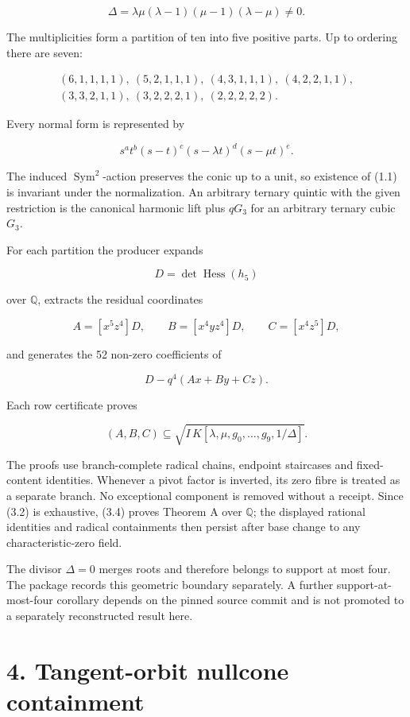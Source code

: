 \documentclass[
  11pt,
]{article}
\begin{document}
\[
\Delta=\lambda\mu(\lambda-1)(\mu-1)(\lambda-\mu)\ne0.
\tag{3.1}
\]

The multiplicities form a partition of ten into five positive parts. Up
to ordering there are seven:

\[
\begin{gathered}
(6,1,1,1,1),\ (5,2,1,1,1),\ (4,3,1,1,1),\
(4,2,2,1,1),\\
(3,3,2,1,1),\ (3,2,2,2,1),\ (2,2,2,2,2).
\end{gathered}
\tag{3.2}
\]

Every normal form is represented by

\[
s^at^b(s-t)^c(s-\lambda t)^d(s-\mu t)^e.
\]

The induced \(\operatorname{Sym}^2\)-action preserves the conic up to a
unit, so existence of (1.1) is invariant under the normalization. An
arbitrary ternary quintic with the given restriction is the canonical
harmonic lift plus \(qG_3\) for an arbitrary ternary cubic \(G_3\).

For each partition the producer expands

\[
D=\det\operatorname{Hess}(h_5)
\]

over \(\mathbb Q\), extracts the residual coordinates

\[
A=[x^5z^4]D,\qquad B=[x^4yz^4]D,\qquad C=[x^4z^5]D,
\]

and generates the 52 non-zero coefficients of

\[
D-q^4(Ax+By+Cz).
\tag{3.3}
\]

Each row certificate proves

\[
(A,B,C)\subseteq
\sqrt{I\,K[\lambda,\mu,g_0,\ldots,g_9,1/\Delta]}.
\tag{3.4}
\]

The proofs use branch-complete radical chains, endpoint staircases and
fixed-content identities. Whenever a pivot factor is inverted, its zero
fibre is treated as a separate branch. No exceptional component is
removed without a receipt. Since (3.2) is exhaustive, (3.4) proves
Theorem A over \(\mathbb Q\); the displayed rational identities and
radical containments then persist after base change to any
characteristic-zero field.

The divisor \(\Delta=0\) merges roots and therefore belongs to support
at most four. The package records this geometric boundary separately. A
further support-at-most-four corollary depends on the pinned source
commit and is not promoted to a separately reconstructed result here.

\section{4. Tangent-orbit nullcone
containment}\label{tangent-orbit-nullcone-containment}
\end{document}
